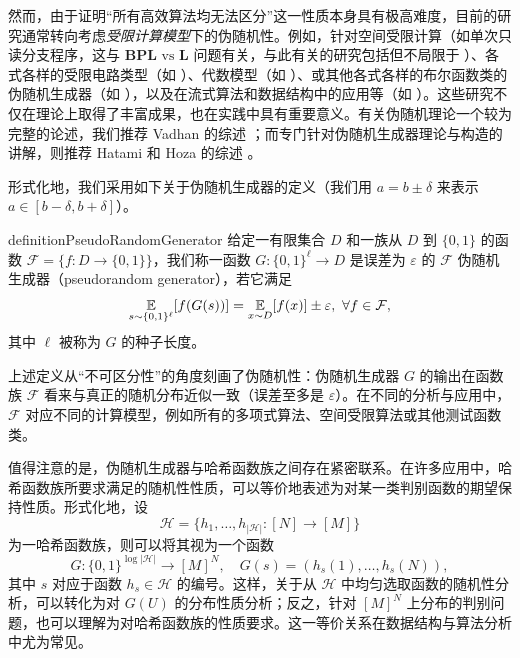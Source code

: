 然而，由于证明“所有高效算法均无法区分”这一性质本身具有极高难度，目前的研究通常转向考虑\emph{受限计算模型}下的伪随机性。例如，针对空间受限计算（如单次只读分支程序，这与 $\mathbf{BPL}\text{ vs }\mathbf{L}$ 问题有关，与此有关的研究包括但不局限于 \cite{Nisan90_PRG,INW94_PRG,NZ96_Nisan_Zuckerman_PRG,Saks_Zhou_BPL_L_1_5,MRT_width_3_ROBP,Hoza_RANDOM21_L_1_5_sqrt,Cheng_Wu_WPRG}）、各式各样的受限电路类型（如 \cite{Lyu_AC0_PRG,DHH_read_once_DNF_PRG,DHH_iterated_restrictions}）、代数模型（如 \cite{NN93_almost_k_wise,Viola2009_low_degree_poly_PRG}）、或其他各式各样的布尔函数类的伪随机生成器（如 \cite{ABI86_construction_t_wise,NN93_almost_k_wise,INW94_PRG,GMRTV,GKM_Fourier_shape,GY20_PRG_CR_SOTA}），以及在流式算法和数据结构中的应用等（如 \cite{Indyk_PRG_streaming,CRSW_gradually_increased_independence,RWW_Pseudorandom_graph_in_DS,xue_load_balancing}）。这些研究不仅在理论上取得了丰富成果，也在实践中具有重要意义。有关伪随机理论一个较为完整的论述，我们推荐 Vadhan 的综述 \cite{Vadhan12_survey_pseudorandomness}；而专门针对伪随机生成器理论与构造的讲解，则推荐 Hatami 和 Hoza 的综述 \cite{Hatami_Hoza_PRG_survey}。

形式化地，我们采用如下关于伪随机生成器的定义（我们用 $a = b \pm \delta$ 来表示 $a \in [b - \delta, b + \delta]$）。

\begin{restatable}{definition}{PseudoRandomGenerator}\label{def:PRG}
    给定一有限集合 $D$ 和一族从 $D$ 到 $\{0, 1\}$ 的函数 $\mathcal{F} = \{f : D \to \{0, 1\}\}$，我们称一函数 $G : \{0, 1\}^\ell \to D$ 是误差为 $\varepsilon$ 的 $\mathcal{F}$ 伪随机生成器（pseudorandom generator），若它满足
    $$
    \operatorname*{\mathbb{E}}_{s \sim \{0, 1\}^\ell}[f(G(s))] = \operatorname*{\mathbb{E}}_{x \sim D}[f(x)] \pm \varepsilon,\ \forall f \in \mathcal{F},
    $$
    其中 $\ell$ 被称为 $G$ 的种子长度。
\end{restatable}

上述定义从“不可区分性”的角度刻画了伪随机性：伪随机生成器 $G$ 的输出在函数族 $\mathcal{F}$ 看来与真正的随机分布近似一致（误差至多是 $\varepsilon$）。在不同的分析与应用中，$\mathcal{F}$ 对应不同的计算模型，例如所有的多项式算法、空间受限算法或其他测试函数类。

值得注意的是，伪随机生成器与哈希函数族之间存在紧密联系。在许多应用中，哈希函数族所要求满足的随机性性质，可以等价地表述为对某一类判别函数的期望保持性质。形式化地，设
$$
\mathcal{H} = \{h_1, \ldots, h_{|\mathcal{H}|} : [N] \to [M]\}
$$
为一哈希函数族，则可以将其视为一个函数
$$
G : \{0,1\}^{\log |\mathcal{H}|} \to [M]^N,\quad
G(s) = (h_s(1), \ldots, h_s(N)),
$$
其中 $s$ 对应于函数 $h_s \in \mathcal{H}$ 的编号。这样，关于从 $\mathcal{H}$ 中均匀选取函数的随机性分析，可以转化为对 $G(U)$ 的分布性质分析；反之，针对 $[M]^N$ 上分布的判别问题，也可以理解为对哈希函数族的性质要求。这一等价关系在数据结构与算法分析中尤为常见。


